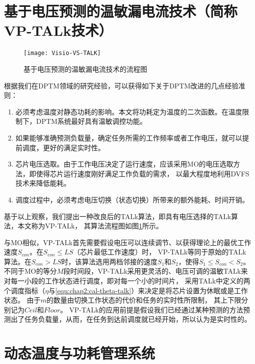\section{基于电压预测的温敏漏电流技术（简称VP-TALk技术）}
\begin{figure}[H] %
  \centering
  \texttt{[image: Visio-VS-TALK]}
  \caption{基于电压预测的温敏漏电流技术的流程图}
  \label{fig:vp-talk}
\end{figure}
\label{sec:vp-talk}
根据我们在DPTM领域的研究经验，可以获得如下关于DPTM改进的几点经验准则：
\begin{enumerate}[1)]
\item 必须考虑温度对静态功耗的影响。本文将功耗定为温度的二次函数。在温度限制下，DPTM系统最好具有温敏调控功能。
\item 如果能够准确预测负载量，确定任务所需的工作频率或者工作电压，就可以提前调度，更好的满足实时性。
\item 芯片电压选取。由于工作电压决定了运行速度，应该采用MO的电压选取方法，即使得芯片运行速度刚好满足工作负载的需求， 以最大程度地利用DVFS技术来降低能耗。
\item 调度过程中，必须考虑电压切换（状态切换）所带来的额外能耗、时间开销。
\end{enumerate}

基于以上观察，我们提出一种改良后的TALk算法，即具有电压选择的TALk算法，本文称为VP-TALk， 其算法流程图如图\ref{fig:vp-talk}所示。

与MO相似，VP-TALk首先需要假设电压可以连续调节、以获得理论上的最优工作速度$S_{con}$。在$S_{con}\leq LS$（芯片最低工作速度）时， VP-TALk等同于原始的TALk算法。在$S_{con}>{LS}$时，该算法选用两档邻接的速度$S_1$和$S_2$，使得$S_1\leq S_{con}<S_2$。 不同于MO的等分$M$段时间段，VP-TALk采用更灵活的、电压可调的温敏TALk来对每一小段的工作状态进行调度，即对每一个小的时间片， 采用TALk中定义的两个调度指标（$\eta$与\ref{equ:chap2:cal-theta-talk}）来决定是将芯片设置为休眠或是工作状态。 由于$m$的数量由切换工作状态的代价和任务的实时性所限制， 其上下限分别记为$Ceil$和$Floor$。 VP-TALk的应用前提是假设我们已经通过某种预测的方法预测出了任务负载量，从而，在任务到达前调度就已经开始，所以认为是实时性的。



\section{动态温度与功耗管理系统}
\label{DPTM-system}
